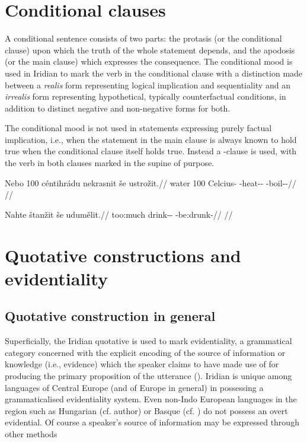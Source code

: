 \section{Conditional clauses}

A conditional sentence consists of two parts: the protasis (or the conditional
clause) upon which the truth of the whole statement depends, and the apodosis
(or the main clause) which expresses the consequence. The conditional mood is
used in Iridian to mark the verb in the conditional clause with a distinction
made between a \emph{realis} form representing logical implication and
sequentiality and an \emph{irrealis} form representing hypothetical, typically
counterfactual conditions, in addition to distinct negative and non-negative
forms for both.

The conditional mood is not used in statements expressing purely factual
implication, i.e., when the statement in the main clause is always known to hold
true when the conditional clause itself holds true. Instead a -clause is
used, with the verb in both clauses marked in the supine of purpose.

\pex
\begingl
\gla Nebo 100 céntihrádu nekrasnit še ustrožit.//
\glb water 100 Celcius-\Ins{} \Caus{}-heat-\Pv{}-\SupP{} \Com{} \Refl{}-boil-\Av{}-\SupP{}//
\glft {}//
\endgl
\xe

\pex
\begingl
\gla Nahte štanžit še udumělit.//
\glb too:much drink-\Av-\SupP{} \Com{} \Refl{}-be:drunk-\SupP{}//
\glft {}//
\endgl
\xe

\section{Quotative constructions and  evidentiality}\label{sec:reportedspeech}

\subsection{Quotative construction in general}

Superficially, the Iridian quotative is used to mark {\sc evidentiality}, a
grammatical category concerned with the explicit encoding of the source of
information or knowledge (i.e., evidence) which the speaker claims to have made
use of for producing the primary proposition of the utterance
(\cite[1-2]{diewald2010}). Iridian is unique among languages of Central Europe
(and of Europe in general) in possessing a grammaticalised evidentiality system.
Even non-Indo European languages in the region such as Hungarian (cf. author) or
Basque (cf. \cite{alcazar2010}) do not possess an overt evidential. Of course a
speaker’s source of information may be expressed through other methods 

